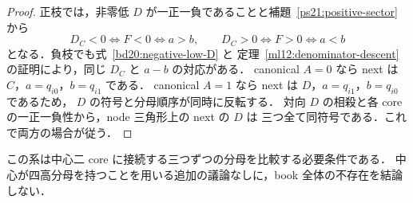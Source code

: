 \begin{proof}
正枝では，非零低 $D$ が一正一負であることと補題~\ref{ps21:positive-sector} から
\[
 D_C<0\Longleftrightarrow F<0\Longleftrightarrow a>b,
 \qquad
 D_C>0\Longleftrightarrow F>0\Longleftrightarrow a<b
\]
となる．負枝でも式~\eqref{bd20:negative-low-D} と
定理~\ref{ml12:denominator-descent} の証明により，同じ $D_C$ と $a-b$ の対応がある．
canonical $A=0$ なら next は $C$，$a=q_{i0}$，$b=q_{i1}$ である．
canonical $A=1$ なら next は $D$，$a=q_{i1}$，$b=q_{i0}$ であるため，
$D$ の符号と分母順序が同時に反転する．
対向 $D$ の相殺と各 core の一正一負性から，node 三角形上の next の $D$ は
三つ全て同符号である．これで両方の場合が従う．
\end{proof}

この系は中心二 core に接続する三つずつの分母を比較する必要条件である．
中心が四高分母を持つことを用いる追加の議論なしに，book 全体の不存在を結論しない．
